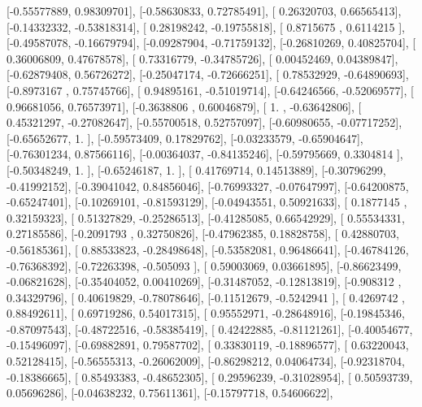 \documentclass{article}
\begin{document}
       [-0.55577889,  0.98309701],
       [-0.58630833,  0.72785491],
       [ 0.26320703,  0.66565413],
       [-0.14332332, -0.53818314],
       [ 0.28198242, -0.19755818],
       [ 0.8715675 ,  0.6114215 ],
       [-0.49587078, -0.16679794],
       [-0.09287904, -0.71759132],
       [-0.26810269,  0.40825704],
       [ 0.36006809,  0.47678578],
       [ 0.73316779, -0.34785726],
       [ 0.00452469,  0.04389847],
       [-0.62879408,  0.56726272],
       [-0.25047174, -0.72666251],
       [ 0.78532929, -0.64890693],
       [-0.8973167 ,  0.75745766],
       [ 0.94895161, -0.51019714],
       [-0.64246566, -0.52069577],
       [ 0.96681056,  0.76573971],
       [-0.3638806 ,  0.60046879],
       [ 1.        , -0.63642806],
       [ 0.45321297, -0.27082647],
       [-0.55700518,  0.52757097],
       [-0.60980655, -0.07717252],
       [-0.65652677,  1.        ],
       [-0.59573409,  0.17829762],
       [-0.03233579, -0.65904647],
       [-0.76301234,  0.87566116],
       [-0.00364037, -0.84135246],
       [-0.59795669,  0.3304814 ],
       [-0.50348249,  1.        ],
       [-0.65246187,  1.        ],
       [ 0.41769714,  0.14513889],
       [-0.30796299, -0.41992152],
       [-0.39041042,  0.84856046],
       [-0.76993327, -0.07647997],
       [-0.64200875, -0.65247401],
       [-0.10269101, -0.81593129],
       [-0.04943551,  0.50921633],
       [ 0.1877145 ,  0.32159323],
       [ 0.51327829, -0.25286513],
       [-0.41285085,  0.66542929],
       [ 0.55534331,  0.27185586],
       [-0.2091793 ,  0.32750826],
       [-0.47962385,  0.18828758],
       [ 0.42880703, -0.56185361],
       [ 0.88533823, -0.28498648],
       [-0.53582081,  0.96486641],
       [-0.46784126, -0.76368392],
       [-0.72263398, -0.505093  ],
       [ 0.59003069,  0.03661895],
       [-0.86623499, -0.06821628],
       [-0.35404052,  0.00410269],
       [-0.31487052, -0.12813819],
       [-0.908312  ,  0.34329796],
       [ 0.40619829, -0.78078646],
       [-0.11512679, -0.5242941 ],
       [ 0.4269742 ,  0.88492611],
       [ 0.69719286,  0.54017315],
       [ 0.95552971, -0.28648916],
       [-0.19845346, -0.87097543],
       [-0.48722516, -0.58385419],
       [ 0.42422885, -0.81121261],
       [-0.40054677, -0.15496097],
       [-0.69882891,  0.79587702],
       [ 0.33830119, -0.18896577],
       [ 0.63220043,  0.52128415],
       [-0.56555313, -0.26062009],
       [-0.86298212,  0.04064734],
       [-0.92318704, -0.18386665],
       [ 0.85493383, -0.48652305],
       [ 0.29596239, -0.31028954],
       [ 0.50593739,  0.05696286],
       [-0.04638232,  0.75611361],
       [-0.15797718,  0.54606622],
\end{document}
